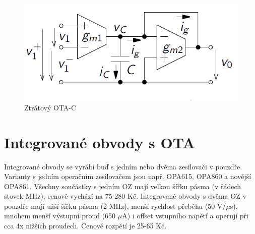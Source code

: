 \documentclass[twoside]{article}
\begin{document}
\begin{figure}[H]
\centering
\includegraphics[scale=0.5]{damp.png}
\caption{Ztrátový OTA-C \cite{4}}
\end{figure}
\newpage
\section{Integrované obvody s OTA}
Integrované obvody se vyrábí buď s jedním nebo dvěma zesilovači v pouzdře. Varianty s jedním operačním zesilovačem jsou např. OPA615, OPA860 a novější OPA861. Všechny součástky s jedním OZ mají velkou šířku pásma (v řádech stovek MHz), cenově vychází na 75-280 Kč. Integrované obvody s dvěma OZ v pouzdře mají užší šířku pásma (2 MHz), menší rychlost přeběhu (50 V/$\mu$s), mnohem menší výstupní proud (650 $\mu$A) i offset vstupního napětí a operují při cca 4x nižších proudech. Cenové rozpětí je 25-65 Kč.
\renewcommand{\arraystretch}{1.5}
\begin{table}[H]
  \caption{\label{tab:Porovnání integrovaných obvodů s jedním OTA}orovnání integrovaných obvodů s jedním OTA \cite{5}}
  \end{table}
\end{document}
